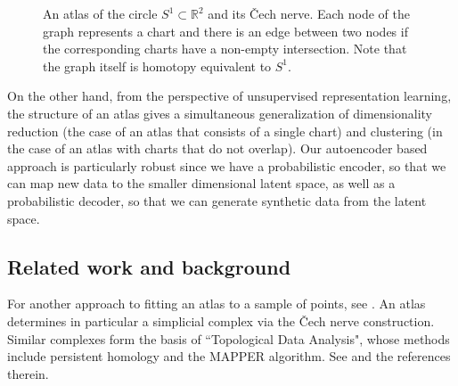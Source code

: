 \documentclass[reqno,11pt]{article}
\newcommand{\R}{\mathbb{R}}
\begin{document}
\begin{figure}[h]
\centering
\captionsetup{width=.7\linewidth}
   \hspace{30pt}  
\caption{An atlas of the circle $S^1 \subset \R^2$ and its \v Cech nerve. Each node of the graph represents a chart and there is an edge between two nodes if the corresponding charts have a non-empty intersection. Note that the graph itself is homotopy equivalent to $S^1$.}
\label{S1-atlas}
\end{figure}

On the other hand, from the perspective of unsupervised representation learning, the structure of an atlas gives a simultaneous generalization of dimensionality reduction (the case of an atlas that consists of a single chart) and clustering (in the case of an atlas with charts that do not overlap). Our autoencoder based approach is particularly robust since we have a probabilistic encoder, so that we can map new data to the smaller dimensional latent space, as well as a probabilistic decoder, so that we can generate synthetic data from the latent space.


\subsection{Related work and background}
For another approach to fitting an atlas to a sample of points, see \cite{ATLAS}. An atlas determines in particular a simplicial complex via the \v Cech nerve construction. Similar complexes form the basis of ``Topological Data Analysis", whose methods include persistent homology and the MAPPER algorithm. See \cite{TDA} and the references therein. 
\end{document}
